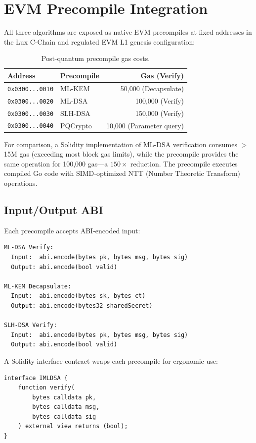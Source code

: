 \section{EVM Precompile Integration}

\label{sec:precompiles}

All three algorithms are exposed as native EVM precompiles at fixed
addresses in the Lux C-Chain and regulated EVM L1 genesis configuration:

\begin{table}[h]
\centering
\begin{tabular}{llr}
\toprule
\textbf{Address} & \textbf{Precompile} & \textbf{Gas (Verify)} \\
\midrule
\texttt{0x0300...0010} & ML-KEM & 50,000 (Decapsulate) \\
\texttt{0x0300...0020} & ML-DSA & 100,000 (Verify) \\
\texttt{0x0300...0030} & SLH-DSA & 150,000 (Verify) \\
\texttt{0x0300...0040} & PQCrypto & 10,000 (Parameter query) \\
\bottomrule
\end{tabular}
\caption{Post-quantum precompile gas costs.}
\label{tab:gas}
\end{table}

For comparison, a Solidity implementation of ML-DSA verification
consumes $>$15M gas (exceeding most block gas limits), while the
precompile provides the same operation for 100,000 gas---a $150\times$
reduction.  The precompile executes compiled Go code with SIMD-optimized
NTT (Number Theoretic Transform) operations.

\subsection{Input/Output ABI}

Each precompile accepts ABI-encoded input:

\begin{verbatim}
ML-DSA Verify:
  Input:  abi.encode(bytes pk, bytes msg, bytes sig)
  Output: abi.encode(bool valid)

ML-KEM Decapsulate:
  Input:  abi.encode(bytes sk, bytes ct)
  Output: abi.encode(bytes32 sharedSecret)

SLH-DSA Verify:
  Input:  abi.encode(bytes pk, bytes msg, bytes sig)
  Output: abi.encode(bool valid)
\end{verbatim}

A Solidity interface contract wraps each precompile for ergonomic use:

\begin{verbatim}
interface IMLDSA {
    function verify(
        bytes calldata pk,
        bytes calldata msg,
        bytes calldata sig
    ) external view returns (bool);
}
\end{verbatim}

